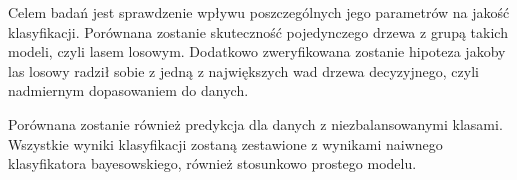 Celem badań jest sprawdzenie wpływu poszczególnych jego parametrów na  jakość klasyfikacji. Porównana zostanie skuteczność pojedynczego drzewa z grupą takich modeli, czyli lasem losowym. Dodatkowo zweryfikowana zostanie hipoteza jakoby las losowy radził sobie z jedną z największych wad drzewa decyzyjnego, czyli nadmiernym dopasowaniem do danych.

Porównana zostanie również predykcja dla danych z niezbalansowanymi klasami. Wszystkie wyniki klasyfikacji zostaną zestawione z wynikami naiwnego klasyfikatora bayesowskiego, również stosunkowo prostego modelu.